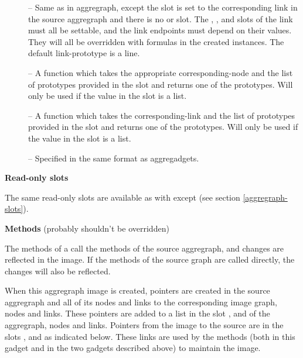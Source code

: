 \begin{description}
\begin{description}
\item[]                  -- Same as in aggregraph, except the
                 slot is set to the corresponding link in
                the source aggregraph and there is no  or  slot.  The
, ,  and  slots of the link must all be
settable, and the link
endpoints must depend on their values.  They will all be overridden with
formulas in the created instances.  The default link-prototype is a line.

\item[]  -- A function which takes the appropriate
corresponding-node and the list of prototypes provided in the 
slot and returns one of the prototypes.  Will only be used if the value in the
 slot is a list.

\item[]  -- A function which takes the
corresponding-link and the list of prototypes provided in
the  slot and returns one of the prototypes.
Will only be used if the value in the  slot is a list.

\item[]                  -- Specified in the same format as
		aggregadgets.
        \end{description}

\item[] {\bf Read-only slots}

\item[] The same read-only slots are available as with  except
 (see section \ref{aggregraph-slots}).

\item[] {\bf Methods} (probably shouldn't be overridden)

\item[] The methods of a  call the methods of the source
aggregraph, and changes are reflected in the image.  If the methods of the
source graph are called directly, the changes will also be reflected.

\item[] When this aggregraph image is created, pointers are created in the source
aggregraph and all of its nodes and links to the corresponding image graph,
nodes and links.  These pointers are added to a list in the slot
,  and 
of the aggregraph, nodes and links.  Pointers from the image
to the source are in the slots ,
 and  as indicated below.
These links are used by the methods (both in this
gadget and in the two gadgets described above) to maintain the image.


\end{description}
